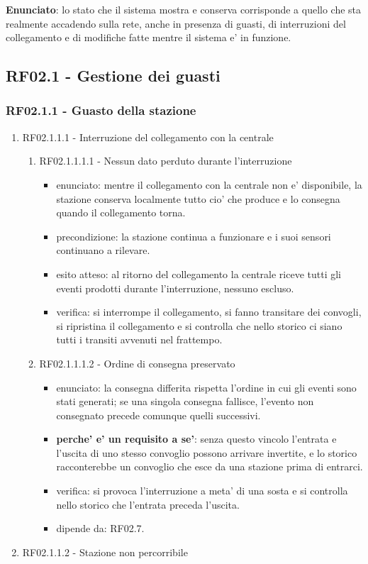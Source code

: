 \documentclass[11pt]{article}
\begin{document}
\textbf{Enunciato}: lo stato che il sistema mostra e conserva corrisponde a quello che sta realmente
accadendo sulla rete, anche in presenza di guasti, di interruzioni del collegamento e di modifiche
fatte mentre il sistema e' in funzione.
\subsection{RF02.1 - Gestione dei guasti}
\label{sec:org410c702}

\subsubsection{RF02.1.1 - Guasto della stazione}
\label{sec:org94cd50e}

\begin{enumerate}
\item RF02.1.1.1 - Interruzione del collegamento con la centrale
\label{sec:orgb2535b1}

\begin{enumerate}
\item RF02.1.1.1.1 - Nessun dato perduto durante l'interruzione
\label{sec:org485ce6c}
\begin{itemize}
\item enunciato: mentre il collegamento con la centrale non e' disponibile, la stazione conserva
localmente tutto cio' che produce e lo consegna quando il collegamento torna.
\item precondizione: la stazione continua a funzionare e i suoi sensori continuano a rilevare.
\item esito atteso: al ritorno del collegamento la centrale riceve tutti gli eventi prodotti durante
l'interruzione, nessuno escluso.
\item verifica: si interrompe il collegamento, si fanno transitare dei convogli, si ripristina il
collegamento e si controlla che nello storico ci siano tutti i transiti avvenuti nel frattempo.
\end{itemize}
\item RF02.1.1.1.2 - Ordine di consegna preservato
\label{sec:org0ecb782}
\begin{itemize}
\item enunciato: la consegna differita rispetta l'ordine in cui gli eventi sono stati generati; se una
singola consegna fallisce, l'evento non consegnato precede comunque quelli successivi.
\item \textbf{perche' e' un requisito a se'}: senza questo vincolo l'entrata e l'uscita di uno stesso convoglio
possono arrivare invertite, e lo storico racconterebbe un convoglio che esce da una stazione prima
di entrarci.
\item verifica: si provoca l'interruzione a meta' di una sosta e si controlla nello storico che l'entrata
preceda l'uscita.
\item dipende da: RF02.7.
\end{itemize}
\end{enumerate}
\item RF02.1.1.2 - Stazione non percorribile
\label{sec:org5f379ab}


\end{enumerate}
\end{document}
